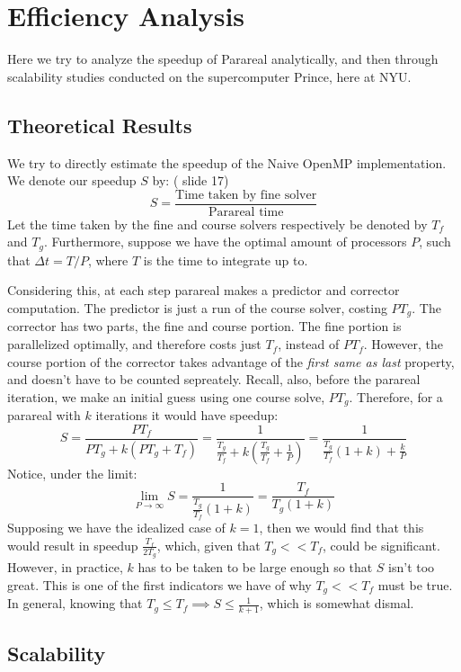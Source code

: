 \section{Efficiency Analysis}

Here we try to analyze the speedup of Parareal analytically, and then through
scalability studies conducted on the supercomputer Prince, here at NYU. 

\subsection{Theoretical Results}

We try to directly estimate the speedup of the Naive OpenMP implementation. We
denote our speedup $S$ by: (\cite{fieldstalk} slide 17)
\begin{equation*}
  S = \frac{\text{Time taken by fine solver}}{\text{Parareal time}}
\end{equation*}
Let the time taken by the fine and course solvers respectively be denoted by
$T_f$ and $T_g$. Furthermore, suppose we have the optimal amount of processors
$P$, such that $\Delta t = T/P$, where $T$ is the time to integrate up to.

Considering this, at each step parareal makes a predictor and corrector
computation. The predictor is just a run of the course solver, costing $PT_g$.
The corrector has two parts, the fine and course portion. The fine portion is
parallelized optimally, and therefore costs just $T_f$, instead of $PT_f$.
However, the course portion of the corrector takes advantage of the
\textit{first same as last} property, and doesn't have to be counted sepreately.
Recall, also, before the parareal iteration, we make an initial guess using one
course solve, $PT_g$. Therefore, for a parareal with $k$ iterations it would
have speedup:
\[
  S = \frac{PT_f}{PT_g + k(PT_g + T_f)} 
  = \frac{1}{\frac{T_g}{T_f} + k(\frac{T_g}{T_f} + \frac{1}{P})} 
  = \frac{1}{\frac{T_g}{T_f}(1+k) + \frac{k}{P}} 
\]
Notice, under the limit:
\[
  \lim_{P \to \infty} S = \frac{1}{\frac{T_g}{T_f}(1+k)} = \frac{T_f}{T_g(1+k)}
\]
Supposing we have the idealized case of $k = 1$, then we would find that this
would result in speedup $\frac{T_f}{2T_g}$, which, given that $T_g << T_f$,
could be significant. However, in practice, $k$ has to be taken to be large
enough so that $S$ isn't too great. This is one of the first indicators we have
of why $T_g << T_f$ must be true. In general, knowing that $T_g \leq T_f
\implies S \leq \frac{1}{k+1}$, which is somewhat dismal. 

\subsection{Scalability}
